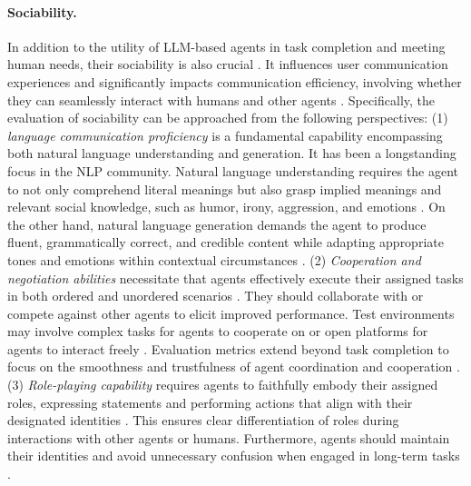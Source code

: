 \paragraph{Sociability.}
In addition to the utility of LLM-based agents in task completion and meeting human needs, their sociability is also crucial \cite{DBLP:journals/cacm/GeneserethK94}. 
It influences user communication experiences and significantly impacts communication efficiency, involving whether they can seamlessly interact with humans and other agents \cite{DBLP:journals/corr/abs-2001-09977, DBLP:journals/ijsr/AbramsP20, kim2023help}. 
Specifically, the evaluation of sociability can be approached from the following perspectives: 
(1) \textit{language communication proficiency} is a fundamental capability encompassing both natural language understanding and generation. It has been a longstanding focus in the NLP community. Natural language understanding requires the agent to not only comprehend literal meanings but also grasp implied meanings and relevant social knowledge, such as humor, irony, aggression, and emotions \cite{DBLP:journals/corr/abs-2110-03949, DBLP:journals/corr/abs-2305-14938, wilson2019if}. On the other hand, natural language generation demands the agent to produce fluent, grammatically correct, and credible content while adapting appropriate tones and emotions within contextual circumstances \cite{DBLP:journals/corr/abs-2305-13711, DBLP:journals/corr/abs-2304-01746,DBLP:conf/conll/SeePSYM19}. 
(2) \textit{Cooperation and negotiation abilities} necessitate that agents effectively execute their assigned tasks in both ordered and unordered scenarios \cite{DBLP:journals/corr/abs-2303-17760, DBLP:journals/corr/abs-2305-14325, DBLP:journals/corr/abs-2304-12998, DBLP:journals/corr/abs-2308-00352}. They should collaborate with or compete against other agents to elicit improved performance. Test environments may involve complex tasks for agents to cooperate on or open platforms for agents to interact freely \cite{DBLP:journals/corr/abs-2304-03442, DBLP:journals/corr/abs-2305-16960, DBLP:journals/corr/abs-2307-07924, DBLP:journals/corr/abs-2308-08155, DBLP:journals/corr/abs-2308-12503, DBLP:journals/corr/abs-2305-11595}. Evaluation metrics extend beyond task completion to focus on the smoothness and trustfulness of agent coordination and cooperation \cite{DBLP:journals/corr/abs-2305-10142, DBLP:journals/corr/abs-2308-00352}. 
(3) \textit{Role-playing capability} requires agents to faithfully embody their assigned roles, expressing statements and performing actions that align with their designated identities \cite{DBLP:journals/corr/abs-2305-14930}.
This ensures clear differentiation of roles during interactions with other agents or humans. Furthermore, agents should maintain their identities and avoid unnecessary confusion when engaged in long-term tasks \cite{DBLP:journals/corr/abs-2304-03442, DBLP:journals/corr/abs-2303-17760,DBLP:conf/naacl/0001USW22}.


